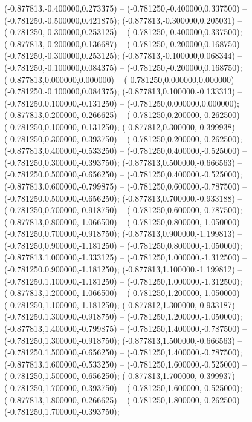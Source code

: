  (-0.877813,-0.400000,0.273375) -- (-0.781250,-0.400000,0.337500) -- (-0.781250,-0.500000,0.421875);
 (-0.877813,-0.300000,0.205031) -- (-0.781250,-0.300000,0.253125) -- (-0.781250,-0.400000,0.337500);
 (-0.877813,-0.200000,0.136687) -- (-0.781250,-0.200000,0.168750) -- (-0.781250,-0.300000,0.253125);
 (-0.877813,-0.100000,0.068344) -- (-0.781250,-0.100000,0.084375) -- (-0.781250,-0.200000,0.168750);
 (-0.877813,0.000000,0.000000) -- (-0.781250,0.000000,0.000000) -- (-0.781250,-0.100000,0.084375);
 (-0.877813,0.100000,-0.133313) -- (-0.781250,0.100000,-0.131250) -- (-0.781250,0.000000,0.000000);
 (-0.877813,0.200000,-0.266625) -- (-0.781250,0.200000,-0.262500) -- (-0.781250,0.100000,-0.131250);
 (-0.877812,0.300000,-0.399938) -- (-0.781250,0.300000,-0.393750) -- (-0.781250,0.200000,-0.262500);
 (-0.877813,0.400000,-0.533250) -- (-0.781250,0.400000,-0.525000) -- (-0.781250,0.300000,-0.393750);
 (-0.877813,0.500000,-0.666563) -- (-0.781250,0.500000,-0.656250) -- (-0.781250,0.400000,-0.525000);
 (-0.877813,0.600000,-0.799875) -- (-0.781250,0.600000,-0.787500) -- (-0.781250,0.500000,-0.656250);
 (-0.877813,0.700000,-0.933188) -- (-0.781250,0.700000,-0.918750) -- (-0.781250,0.600000,-0.787500);
 (-0.877813,0.800000,-1.066500) -- (-0.781250,0.800000,-1.050000) -- (-0.781250,0.700000,-0.918750);
 (-0.877813,0.900000,-1.199813) -- (-0.781250,0.900000,-1.181250) -- (-0.781250,0.800000,-1.050000);
 (-0.877813,1.000000,-1.333125) -- (-0.781250,1.000000,-1.312500) -- (-0.781250,0.900000,-1.181250);
 (-0.877813,1.100000,-1.199812) -- (-0.781250,1.100000,-1.181250) -- (-0.781250,1.000000,-1.312500);
 (-0.877813,1.200000,-1.066500) -- (-0.781250,1.200000,-1.050000) -- (-0.781250,1.100000,-1.181250);
 (-0.877812,1.300000,-0.933187) -- (-0.781250,1.300000,-0.918750) -- (-0.781250,1.200000,-1.050000);
 (-0.877813,1.400000,-0.799875) -- (-0.781250,1.400000,-0.787500) -- (-0.781250,1.300000,-0.918750);
 (-0.877813,1.500000,-0.666563) -- (-0.781250,1.500000,-0.656250) -- (-0.781250,1.400000,-0.787500);
 (-0.877813,1.600000,-0.533250) -- (-0.781250,1.600000,-0.525000) -- (-0.781250,1.500000,-0.656250);
 (-0.877813,1.700000,-0.399937) -- (-0.781250,1.700000,-0.393750) -- (-0.781250,1.600000,-0.525000);
 (-0.877813,1.800000,-0.266625) -- (-0.781250,1.800000,-0.262500) -- (-0.781250,1.700000,-0.393750);
